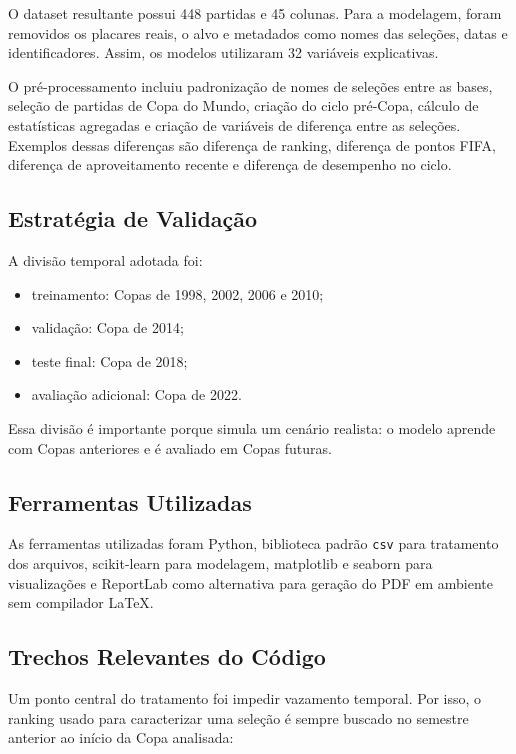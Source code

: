 \documentclass[12pt,a4paper]{article}
\begin{document}
O dataset resultante possui 448 partidas e 45 colunas. Para a modelagem, foram
removidos os placares reais, o alvo e metadados como nomes das seleções, datas e
identificadores. Assim, os modelos utilizaram 32 variáveis explicativas.

O pré-processamento incluiu padronização de nomes de seleções entre as bases,
seleção de partidas de Copa do Mundo, criação do ciclo pré-Copa, cálculo de
estatísticas agregadas e criação de variáveis de diferença entre as seleções.
Exemplos dessas diferenças são diferença de ranking, diferença de pontos FIFA,
diferença de aproveitamento recente e diferença de desempenho no ciclo.

\subsection{Estratégia de Validação}

A divisão temporal adotada foi:

\begin{itemize}
    \item treinamento: Copas de 1998, 2002, 2006 e 2010;
    \item validação: Copa de 2014;
    \item teste final: Copa de 2018;
    \item avaliação adicional: Copa de 2022.
\end{itemize}

Essa divisão é importante porque simula um cenário realista: o modelo aprende
com Copas anteriores e é avaliado em Copas futuras.

\subsection{Ferramentas Utilizadas}

As ferramentas utilizadas foram Python, biblioteca padrão \texttt{csv} para
tratamento dos arquivos, scikit-learn para modelagem, matplotlib e seaborn para
visualizações e ReportLab como alternativa para geração do PDF em ambiente sem
compilador LaTeX.

\subsection{Trechos Relevantes do Código}

Um ponto central do tratamento foi impedir vazamento temporal. Por isso, o
ranking usado para caracterizar uma seleção é sempre buscado no semestre
anterior ao início da Copa analisada:
\end{document}
